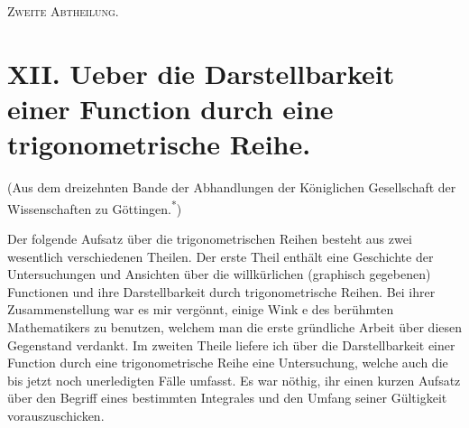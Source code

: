 \documentclass[12pt,a4paper]{article}
\begin{document}
\newpage
\thispagestyle{empty}
\vspace*{\fill}
\begin{center}
{\Huge\scshape Zweite Abtheilung.}
\end{center}
\vspace*{\fill}
\clearpage
\thispagestyle{empty}
\clearpage

\section*{XII. Ueber die Darstellbarkeit einer Function durch eine trigonometrische Reihe.}

\begin{center}
(Aus dem dreizehnten Bande der Abhandlungen der Königlichen Gesellschaft der\\
Wissenschaften zu Göttingen.\textsuperscript{*})
\end{center}

Der folgende Aufsatz über die trigonometrischen Reihen besteht aus zwei wesentlich verschiedenen Theilen. Der erste Theil enthält eine Geschichte der Untersuchungen und Ansichten über die willkürlichen (graphisch gegebenen) Functionen und ihre Darstellbarkeit durch trigonometrische Reihen. Bei ihrer Zusammenstellung war es mir vergönnt, einige Wink e des berühmten Mathematikers zu benutzen, welchem man die erste gründliche Arbeit über diesen Gegenstand verdankt. Im zweiten Theile liefere ich über die Darstellbarkeit einer Function durch eine trigonometrische Reihe eine Untersuchung, welche auch die bis jetzt noch unerledigten Fälle umfasst. Es war nöthig, ihr einen kurzen Aufsatz über den Begriff eines bestimmten Integrales und den Umfang seiner Gültigkeit vorauszuschicken.

\begingroup
\renewcommand{\thefootnote}{}
\endgroup
\end{document}
